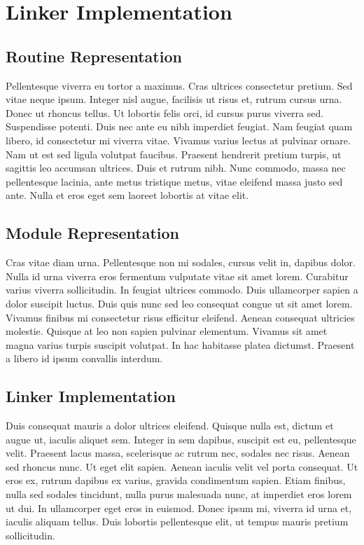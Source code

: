 \chapter{Linker Implementation}


\section{Routine Representation}
Pellentesque viverra eu tortor a maximus. Cras ultrices consectetur pretium. Sed vitae neque ipsum. Integer nisl augue, facilisis ut risus et, rutrum cursus urna. Donec ut rhoncus tellus. Ut lobortis felis orci, id cursus purus viverra sed. Suspendisse potenti. Duis nec ante eu nibh imperdiet feugiat. Nam feugiat quam libero, id consectetur mi viverra vitae. Vivamus varius lectus at pulvinar ornare. Nam ut est sed ligula volutpat faucibus. Praesent hendrerit pretium turpis, ut sagittis leo accumsan ultrices. Duis et rutrum nibh. Nunc commodo, massa nec pellentesque lacinia, ante metus tristique metus, vitae eleifend massa justo sed ante. Nulla et eros eget sem laoreet lobortis at vitae elit.


\section{Module Representation}
Cras vitae diam urna. Pellentesque non mi sodales, cursus velit in, dapibus dolor. Nulla id urna viverra eros fermentum vulputate vitae sit amet lorem. Curabitur varius viverra sollicitudin. In feugiat ultrices commodo. Duis ullamcorper sapien a dolor suscipit luctus. Duis quis nunc sed leo consequat congue ut sit amet lorem. Vivamus finibus mi consectetur risus efficitur eleifend. Aenean consequat ultricies molestie. Quisque at leo non sapien pulvinar elementum. Vivamus sit amet magna varius turpis suscipit volutpat. In hac habitasse platea dictumst. Praesent a libero id ipsum convallis interdum.


\section{Linker Implementation}
Duis consequat mauris a dolor ultrices eleifend. Quisque nulla est, dictum et augue ut, iaculis aliquet sem. Integer in sem dapibus, suscipit est eu, pellentesque velit. Praesent lacus massa, scelerisque ac rutrum nec, sodales nec risus. Aenean sed rhoncus nunc. Ut eget elit sapien. Aenean iaculis velit vel porta consequat. Ut eros ex, rutrum dapibus ex varius, gravida condimentum sapien. Etiam finibus, nulla sed sodales tincidunt, nulla purus malesuada nunc, at imperdiet eros lorem ut dui. In ullamcorper eget eros in euismod. Donec ipsum mi, viverra id urna et, iaculis aliquam tellus. Duis lobortis pellentesque elit, ut tempus mauris pretium sollicitudin.

